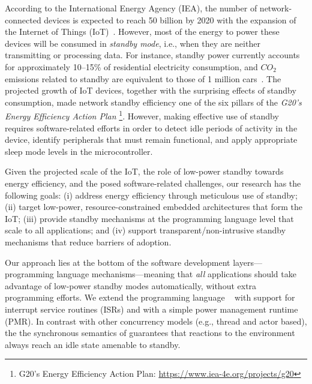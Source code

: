 \label{sec.introduction}

According to the International Energy Agency (IEA), the number of
network-connected devices is expected to reach 50 billion by 2020 with the
expansion of the Internet of Things (IoT)~\cite{iea.data}.
%
However, most of the energy to power these devices will be consumed in
\emph{standby mode}, i.e., when they are neither transmitting or processing
data.
%
For instance, standby power currently accounts for approximately 10--15\% of
residential electricity consumption, and $CO_2$ emissions related to standby
are equivalent to those of 1 million cars~\cite{iea.data,standby.australia}.
%
The projected growth of IoT devices, together with the surprising effects of
standby consumption, made network standby efficiency one of the six
pillars of the \emph{G20's Energy Efficiency Action Plan}%
\footnote{G20's Energy Efficiency Action Plan: \url{https://www.iea-4e.org/projects/g20}}.
%
However, making effective use of standby requires software-related efforts in
order to detect idle periods of activity in the device, identify peripherals
that must remain functional, and apply appropriate sleep mode levels in the
microcontroller.

Given the projected scale of the IoT, the role of low-power standby towards
energy efficiency, and the posed software-related challenges, our research has
the following goals:
%
(i)   address energy efficiency through meticulous use of standby;
(ii)  target low-power, resource-constrained embedded architectures that form
      the IoT;
(iii) provide standby mechanisms at the programming language level that scale
      to all applications; and
(iv)  support transparent/non-intrusive standby mechanisms that reduce barriers
      of adoption.

Our approach lies at the bottom of the software development
layers---programming language mechanisms---meaning that \emph{all} applications
should take advantage of low-power standby modes automatically, without extra
programming efforts.
%
We extend the programming language \CEU~\cite{ceu.sensys13,ceu.tecs17} with
support for interrupt service routines (ISRs) and with a simple power
management runtime (PMR).
%
In contrast with other concurrency models (e.g., thread and actor based), the
the synchronous semantics of \CEU guarantees that reactions to the environment
always reach an idle state amenable to standby.

